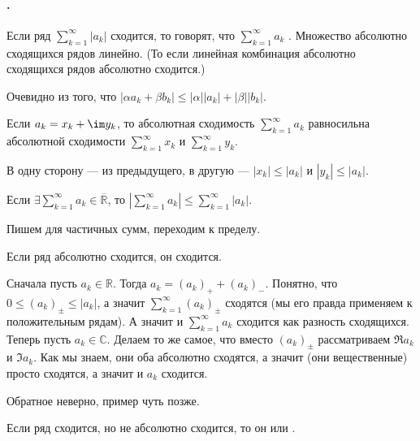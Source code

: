\documentclass{article}
\begin{document}
    \paragraph{.}
    \begin{itemize}
        \dfn Если ряд $\sum\limits_{k=1}^\infty |a_k|$ сходится, то говорят, что $\sum\limits_{k=1}^\infty a_k$ .
        \thm Множество абсолютно сходящихся рядов линейно. (То если линейная комбинация абсолютно сходящихся рядов абсолютно сходится.)
        \begin{Proof}
            Очевидно из того, что $|\alpha a_k+\beta b_k|\leqslant|\alpha||a_k|+|\beta||b_k|$.
        \end{Proof}
        \thm Если $a_k=x_k+\im y_k$, то абсолютная сходимость $\sum\limits_{k=1}^\infty a_k$ равносильна абсолютной сходимости $\sum\limits_{k=1}^\infty x_k$ и $\sum\limits_{k=1}^\infty y_k$.
        \begin{Proof}
            В одну сторону --- из предыдущего, в другую --- $|x_k|\leqslant|a_k|$ и $|y_k|\leqslant|a_k|$.
        \end{Proof}
        \thm Если $\exists\sum\limits_{k=1}^\infty a_k\in\overline{\mathbb R}$, то $\left|\sum\limits_{k=1}^\infty a_k\right|\leqslant\sum\limits_{k=1}^\infty|a_k|$.
        \begin{Proof}
            Пишем для частичных сумм, переходим к пределу.
        \end{Proof}
        \thm Если ряд абсолютно сходится, он сходится.
        \begin{Proof}
            Сначала пусть $a_k\in\mathbb R$. Тогда $a_k=(a_k)_++(a_k)_-$. Понятно, что $0\leqslant(a_k)_\pm\leqslant|a_k|$, а значит $\sum\limits_{k=1}^\infty (a_k)_\pm$ сходятся (мы его правда применяем к положительным рядам). А значит и $\sum\limits_{k=1}^\infty a_k$ сходится как разность сходящихся.\\
            Теперь пусть $a_k\in\mathbb C$. Делаем то же самое, что вместо $(a_k)_\pm$ рассматриваем $\Re a_k$ и $\Im a_k$. Как мы знаем, они оба абсолютно сходятся, а значит (они вещественные) просто сходятся, а значит и $a_k$ сходится.
        \end{Proof}
        \begin{Comment}
            Обратное неверно, пример чуть позже.
        \end{Comment}
        \dfn Если ряд сходится, но не абсолютно сходится, то он  или .

\end{itemize}
\end{document}
